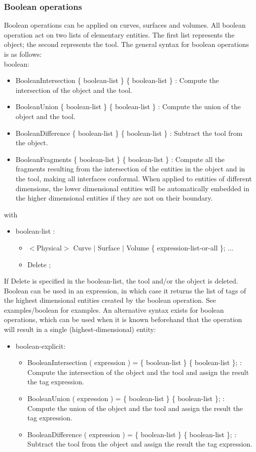 \documentclass[dvipdfmx, 9pt, a4paper]{article}
\numberwithin{equation}{section}
\begin{document}
\subsubsection{Boolean operations}
Boolean operations can be applied on curves, surfaces and volumes. All boolean operation act on two lists of elementary entities. The first list represents the object; the second represents the tool. The general syntax for boolean operations is as follows:\\
boolean:
\begin{itemize}
\item BooleanIntersection \{ boolean-list \} \{ boolean-list \} : Compute the intersection of the object and the tool.
\item BooleanUnion \{ boolean-list \} \{ boolean-list \} : Compute the union of the object and the tool.
\item BooleanDifference \{ boolean-list \} \{ boolean-list \} : Subtract the tool from the object.
\item BooleanFragments \{ boolean-list \} \{ boolean-list \} : Compute all the fragments resulting from the intersection of the entities in the object and in the tool, making all interfaces conformal. When applied to entities of different dimensions, the lower dimensional entities will be automatically embedded in the higher dimensional entities if they are not on their boundary.
\end{itemize}
with
\begin{itemize}
\item boolean-list : 
\begin{itemize}
\item $<$Physical$>$ Curve $|$ Surface $|$ Volume \{ expression-list-or-all \}; ...
\item Delete ;
\end{itemize}
\end{itemize}
If Delete is specified in the boolean-list, the tool and/or the object is deleted. Boolean can be used in an expression, in which case it returns the list of tags of the highest dimensional entities created by the boolean operation. See examples/boolean for examples. An alternative syntax exists for boolean operations, which can be used when it is known beforehand that the operation will result in a single (highest-dimensional) entity:\\
\begin{itemize}
\item boolean-explicit:
\begin{itemize}
\item BooleanIntersection ( expression ) = \{ boolean-list \} \{ boolean-list \}; : Compute the intersection of the object and the tool and assign the result the tag expression.
\item BooleanUnion ( expression ) = \{ boolean-list \} \{ boolean-list \}; : Compute the union of the object and the tool and assign the result the tag expression.
\item BooleanDifference ( expression ) = \{ boolean-list \} \{ boolean-list \}; : Subtract the tool from the object and assign the result the tag expression.
\end{itemize}
\end{itemize}
\end{document}
